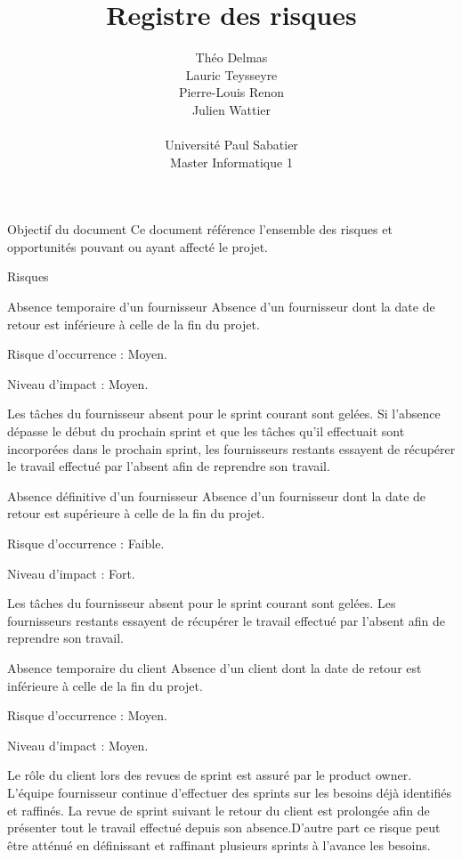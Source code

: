 \documentclass[]{article}
\title{Registre des risques}
\author{
    Théo Delmas\\
    Lauric Teysseyre\\
    Pierre-Louis Renon\\
    Julien Wattier\\
    \\
    Université Paul Sabatier\\
    Master Informatique 1\\
   }
\begin{document}
\maketitle
\newpage
\tableofcontents
\newpage

\begin{section}{Objectif du document}
 Ce document référence l'ensemble des risques et opportunités pouvant ou ayant affecté le projet.
\end{section}

{
\setlength{\parindent}{0pt} %
\begin{section}{Risques}
 \begin{subsection}{Absence temporaire d'un fournisseur}
     Absence d'un fournisseur dont la date de retour est inférieure à celle de la fin du projet.

     Risque d’occurrence : Moyen.

     Niveau d’impact : Moyen.

     Les tâches du fournisseur absent pour le sprint courant sont gelées. Si l'absence dépasse le début du prochain sprint et que les tâches qu'il effectuait sont incorporées dans le prochain sprint, les fournisseurs restants essayent de récupérer le travail effectué par l'absent afin de reprendre son travail.
 \end{subsection}

 \begin{subsection}{Absence définitive d'un fournisseur}
     Absence d'un fournisseur dont la date de retour est supérieure à celle de la fin du projet.

     Risque d’occurrence : Faible.

     Niveau d’impact : Fort.

     Les tâches du fournisseur absent pour le sprint courant sont gelées. Les fournisseurs restants essayent de récupérer le travail effectué par l'absent afin de reprendre son travail.
 \end{subsection}

 \begin{subsection}{Absence temporaire du client}
     Absence d'un client dont la date de retour est inférieure à celle de la fin du projet.

     Risque d’occurrence : Moyen.

     Niveau d’impact : Moyen.

     Le rôle du client lors des revues de sprint est assuré par le product owner. L'équipe fournisseur continue d'effectuer des sprints sur les besoins déjà identifiés et raffinés. La revue de sprint suivant le retour du client est prolongée afin de présenter tout le travail effectué depuis son absence.D'autre part ce risque peut être atténué en définissant et raffinant plusieurs sprints à l'avance les besoins.
 \end{subsection}


\end{section}}
\end{document}
